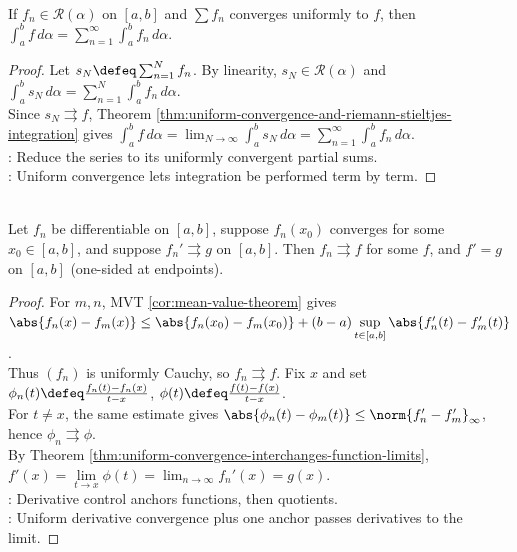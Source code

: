 \begin{corollary} \label{cor:termwise-riemann-stieltjes-integration} \\
If $f_n\in\mathcal{R}(\alpha)$ on $[a,b]$ and $\sum f_n$ converges uniformly to $f$, then $\int_a^b f\,d\alpha=\sum\limits_{n=1}^{\infty}\int_a^b f_n\,d\alpha$.
\begin{proof}
Let $s_N\defeq\sum_{n=1}^{N}f_n$. By linearity, $s_N\in\mathcal{R}(\alpha)$ and $\int_a^b s_N\,d\alpha=\sum_{n=1}^{N}\int_a^b f_n\,d\alpha$.\\
Since $s_N\rightrightarrows f$, Theorem \ref{thm:uniform-convergence-and-riemann-stieltjes-integration} gives $\int_a^b f\,d\alpha=\lim_{N\to\infty}\int_a^b s_N\,d\alpha=\sum\limits_{n=1}^{\infty}\int_a^b f_n\,d\alpha$.\\
: Reduce the series to its uniformly convergent partial sums.\\
: Uniform convergence lets integration be performed term by term.
\end{proof}
\end{corollary}

\begin{theorem} \label{thm:uniform-derivative-convergence} \\
Let $f_n$ be differentiable on $[a,b]$, suppose $f_n(x_0)$ converges for some $x_0\in[a,b]$, and suppose $f_n'\rightrightarrows g$ on $[a,b]$. Then $f_n\rightrightarrows f$ for some $f$, and $f'=g$ on $[a,b]$ (one-sided at endpoints).
\begin{proof}
For $m,n$, MVT \ref{cor:mean-value-theorem} gives $\abs{f_n(x)-f_m(x)}\leq \abs{f_n(x_0)-f_m(x_0)}+(b-a)\sup\limits_{t\in[a,b]}\abs{f_n'(t)-f_m'(t)}$.\\
Thus $(f_n)$ is uniformly Cauchy, so $f_n\rightrightarrows f$. Fix $x$ and set $\phi_n(t)\defeq\frac{f_n(t)-f_n(x)}{t-x}$, $\phi(t)\defeq\frac{f(t)-f(x)}{t-x}$.\\
For $t\neq x$, the same estimate gives $\abs{\phi_n(t)-\phi_m(t)}\leq\norm{f_n'-f_m'}_{\infty}$, hence $\phi_n\rightrightarrows\phi$.\\
By Theorem \ref{thm:uniform-convergence-interchanges-function-limits}, $f'(x)=\lim\limits_{t\to x}\phi(t)=\lim_{n\to\infty}f_n'(x)=g(x)$.\\
: Derivative control anchors functions, then quotients.\\
: Uniform derivative convergence plus one anchor passes derivatives to the limit.
\end{proof}
\end{theorem}

